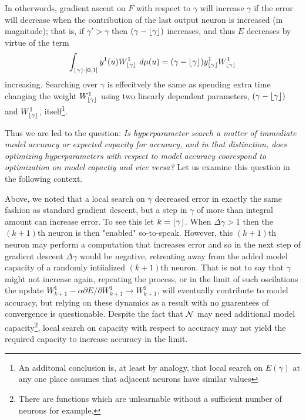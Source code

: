 \documentclass[12pt]{article}
\begin{document}
\begin{itemize}
	In otherwords, gradient ascent on $F$ with respect to $\gamma$ will increase $\gamma$ if the error will decrease when the contribution of the last output neuron is increased (in magnitude); that is, if $\gamma' > \gamma$ then $(\gamma - \floor*{\gamma})$ increases, and thus $E$ decreases by virtue of the term 
	\begin{equation*}
		\int_{\floor*{\gamma}\cdot [0,1]} y^1(u) W^1_{\floor*{\gamma}}\ d\mu(u) = (\gamma - \floor*{\gamma}) y^1_{\floor*{\gamma}} W^1_{\floor*{\gamma}}
	\end{equation*} increasing. Searching over $\gamma$ is effecitvely the same as spending extra time changing the weight $W_{\floor*{\gamma}}^1$ using two linearly dependent parameters, $(\gamma - \floor*{\gamma})$ and $W_{\floor*{\gamma}}^1$, itself\footnote{An additonal conclusion is, at least by analogy, that local search on $E(\gamma)$ at any one place assumes that adjacent neurons have similar values }. 

	Thus we are led to the question: \emph{Is hyperparameter search a matter of immediate model accuracy or expected capacity for accuracy, and in that distinction, does optimizing hyperparameters with respect to model accuracy coorespond to optimization on model capactiy and vice versa?}  Let us examine this question in the following context. \

	Above, we noted that a local search on $\gamma$ decreased error in exactly the same fashion as standard gradient descent, but a step in $\gamma$ of more than integral amount can increase error. To see this let $k = \floor*{\gamma}$. When $\Delta \gamma > 1$ then the $(k+1)$th neuron is then "enabled" so-to-speak. However, this $(k+1)$th neuron may perform a computation that increases error and so in the next step of gradient descent $\Delta \gamma$ would be negative, retreating away from the added model capacity of a randomly intiialized $(k+1)$th neuron. That is not to say that $\gamma$ might not increase again, repeating the process, or in the limit of such oscilations the update $ W^1_{k+1} -\alpha\partial E/\partial W^1_{k+1} \to W^1_{k+1}$, will eventually contribute to model accuracy, but relying on these dynamics as a result with no guarentees of convergence is questionable. Despite the fact that $\scriptn$ may need additional model capacity\footnote{There are functions which are unlearnable without a sufficient number of neurons for example.}, local search on capacity with respect to accuracy may not yield the required capacity to increase accuracy in the limit.



\end{itemize}
\end{document}
